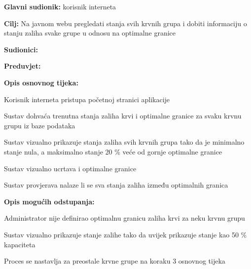 					
					\noindent {}
					\begin{packed_item}
	
						\item \textbf{Glavni sudionik: }korisnik interneta
						\item  \textbf{Cilj:} Na javnom webu pregledati stanja svih krvnih grupa i dobiti informaciju o stanju zaliha svake grupe u odnosu na optimalne granice
						\item  \textbf{Sudionici:}
						\item  \textbf{Preduvjet:} 
						\item  \textbf{Opis osnovnog tijeka:}
						
						\item[] \begin{packed_enum}
	
	                        \item Korisnik interneta pristupa početnoj stranici aplikacije
	                        \item Sustav dohvaća trenutna stanja zaliha krvi i optimalne granice za svaku krvnu grupu iz baze podataka
	                        \item Sustav vizualno prikazuje stanja zaliha svih krvnih grupa tako da je minimalno stanje nula, a maksimalno stanje 20 \% veće od gornje optimalne granice
	                        \item Sustav vizualno ucrtava i optimalne granice
	                        \item Sustav provjerava nalaze li se sva stanja zaliha između optimalnih granica

						\end{packed_enum}
						
						\item  \textbf{Opis mogućih odstupanja:}
						
						\item[] \begin{packed_item}
	
							\item[2] Administrator nije definirao optimalnu granicu zaliha krvi za neku krvnu grupu
							\item[] \begin{packed_enum}
								\item Sustav vizualno prikazuje stanje zalihe tako da uvijek prikazuje stanje kao 50 \% kapaciteta
								\item Proces se nastavlja za preostale krvne grupe na koraku 3 osnovnog tijeka
							\end{packed_enum}


\end{packed_item}
\end{packed_item}
